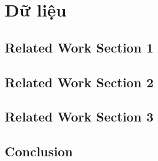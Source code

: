 %
\chapter{Dữ liệu}
\label{sec:data}

\Blindtext[2][1]

\section{Related Work Section 1}
\label{sec:related:sec1}

\Blindtext[2][2]

\section{Related Work Section 2}
\label{sec:related:sec2}

\Blindtext[3][2]

\section{Related Work Section 3}
\label{sec:related:sec3}

\Blindtext[4][2]

\section{Conclusion}
\label{sec:related:conclusion}

\Blindtext[2][1]

